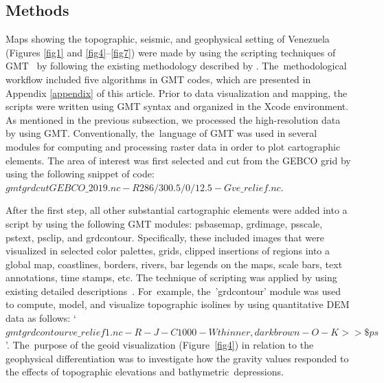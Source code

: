 \documentclass[sustainability,article,accept,pdftex,moreauthors]{Definitions/mdpi}
\begin{document}
\subsection{Methods}
Maps {showing the }topographic, seismic, and geophysical {setting of Venezuela }\linebreak{}(Figures \ref{fig1} and \ref{fig4}--\ref{fig7}) were made by using the scripting techniques{ }of{ }GMT~\cite{Wessel} by following the existing {methodology } described by \citep{Lemenkova2022b,Lemenkova202217}. The~methodological workflow included {five }algorithms in GMT codes, {which are presented in  Appendix \ref{appendix}  of this article.} Prior to data visualization and mapping, the{ scripts }were written using {GMT} syntax and {organized }in the Xcode environment. {As mentioned in the previous subsection, we processed the high-resolution data by using GMT. Conventionally, the~}language of GMT was used {in several modules for computing and processing raster data }in order to plot{ }cartographic elements. {The} area of interest was first selected and cut from the GEBCO grid by using the following {snippet of }code: $gmt grdcut GEBCO\_2019.nc -R286/300.5/0/12.5-Gve\_relief.nc$. %

After the first step, all other  substantial cartographic elements{ }were added into a script by using the following GMT modules: psbasemap, grdimage, psscale, pstext, psclip, and grdcontour. {Specifically, these included} images that were visualized in selected color palettes, grids, clipped insertions of regions into a global map, %
 coastlines, borders, rivers, bar legends {on the maps}, scale bars{, }text annotations, time stamps{, etc. }The technique of scripting was applied by using  existing detailed descriptions~\cite{Lemenkova2021b}. For~example, the~'grdcontour' module was used to compute, model, and visualize topographic isolines by using quantitative DEM data as follows: `$gmt grdcontour ve\_relief1.nc -R -J -C1000 -Wthinner,darkbrown -O -K >> \$ps$'. The~purpose of the geoid visualization (Figure~\ref{fig4}) in relation to the geophysical differentiation was to investigate how the gravity values responded to the effects of topographic elevations and bathymetric~depressions. 
\end{document}
